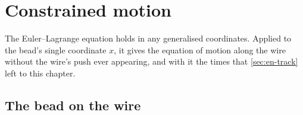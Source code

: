 \section{Constrained motion}
\label{sec:la-constrained}

The Euler--Lagrange equation holds in any generalised coordinates. Applied to the bead's single coordinate $x$, it
gives the equation of motion along the wire without the wire's push ever
appearing, and with it the times that \cref{sec:en-track} left to this
chapter.

\subsection*{The bead on the wire}

